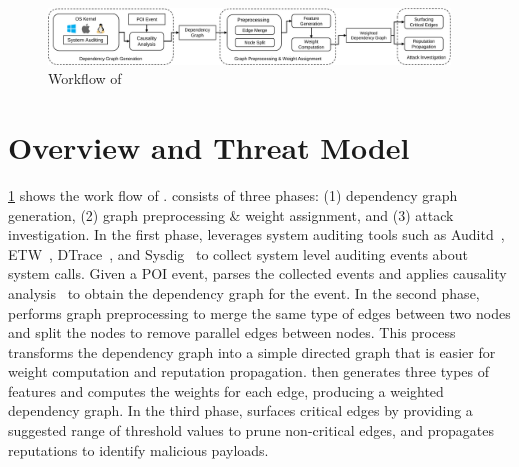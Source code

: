 \begin{figure}[!ht]
    \centering
    \includegraphics[width=0.95\textwidth,clip]{figs/overview-crop.pdf}
    \caption{Workflow of \tool}
    \label{fig:overview}
    \vspace*{-1ex}
\end{figure}


\section{Overview and Threat Model}
\label{sec:overview}

\cref{fig:overview} shows the work flow of \tool. 
\tool consists of three phases: (1) dependency graph generation, (2) graph preprocessing \& weight assignment, and (3) attack investigation.
In the first phase, 
\tool leverages system auditing tools such as Auditd~\cite{auditd}, ETW~\cite{etw}, DTrace~\cite{dtrace}, and Sysdig~\cite{sysdig} to collect system level auditing events about system calls.
Given a POI event, \tool parses the collected events and applies causality analysis~\cite{backtracking,backtracking2} to obtain the dependency graph for the event.
In the second phase, 
  \tool performs graph preprocessing to merge the same type of edges between two nodes
and split the nodes to remove parallel edges between nodes.
This process transforms the dependency graph into a simple directed graph that is easier for weight computation and reputation propagation.
\tool then generates three types of features and computes the weights for each edge,
producing a weighted dependency graph.
In the third phase,
\tool surfaces critical edges by providing a suggested range of threshold values to prune non-critical edges,
and propagates reputations to identify malicious payloads.




